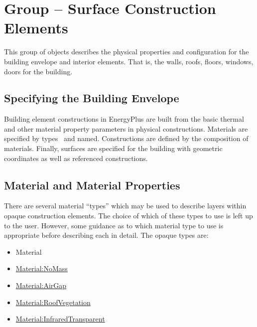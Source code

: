 \section{Group -- Surface Construction Elements}\label{group-surface-construction-elements}

This group of objects describes the physical properties and configuration for the building envelope and interior elements. That is, the walls, roofs, floors, windows, doors for the building.

\subsection{Specifying the Building Envelope}\label{specifying-the-building-envelope}

Building element constructions in EnergyPlus are built from the basic thermal and other material property parameters in physical constructions. Materials are specified by types~ and named. Constructions are defined by the composition of materials. Finally, surfaces are specified for the building with geometric coordinates as well as referenced constructions.

\subsection{Material and Material Properties}\label{material-and-material-properties}

There are several material ``types'' which may be used to describe layers within opaque construction elements. The choice of which of these types to use is left up to the user. However, some guidance as to which material type to use is appropriate before describing each in detail. The opaque types are:

\begin{itemize}
\item
  Material
\item
  \hyperref[materialnomass]{Material:NoMass}
\item
  \hyperref[materialairgap]{Material:AirGap}
\item
  \hyperref[materialroofvegetation]{Material:RoofVegetation}
\item
  \hyperref[materialinfraredtransparent]{Material:InfraredTransparent}
\end{itemize}

